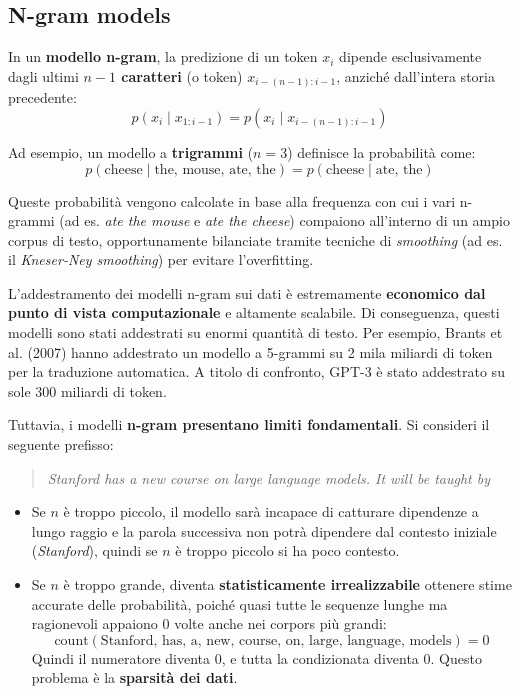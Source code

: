 \subsection{N-gram models}

In un \textbf{modello n-gram}, la predizione di un token $x_i$ dipende esclusivamente dagli ultimi \textbf{$n - 1$ caratteri} (o token) $x_{i-(n-1):i-1}$, anziché dall'intera storia precedente:
\[
p(x_i \mid x_{1:i-1}) = p(x_i \mid x_{i-(n-1):i-1})
\]

Ad esempio, un modello a \textbf{trigrammi} ($n = 3$) definisce la probabilità come:
\[
p(\text{cheese} \mid \text{the, mouse, ate, the}) = p(\text{cheese} \mid \text{ate, the})
\]

Queste probabilità vengono calcolate in base alla frequenza con cui i vari n-grammi (ad es. \textit{ate the mouse} e \textit{ate the cheese}) compaiono all'interno di un ampio corpus di testo, opportunamente bilanciate tramite tecniche di \textit{smoothing} (ad es. il \textit{Kneser-Ney smoothing}) per evitare l'overfitting.

L'addestramento dei modelli n-gram sui dati è estremamente \textbf{economico dal punto di vista computazionale} e altamente scalabile. Di conseguenza, questi modelli sono stati addestrati su enormi quantità di testo. Per esempio, Brants et al. (2007) hanno addestrato un modello a 5-grammi su 2 mila miliardi di token per la traduzione automatica.
A titolo di confronto, GPT-3 è stato addestrato su sole 300 miliardi di token.

Tuttavia, i modelli \textbf{n-gram presentano limiti fondamentali}. Si consideri il seguente prefisso:
\begin{quote}
\textit{Stanford has a new course on large language models. It will be taught by \underline{\hspace{1cm}}}
\end{quote}

\begin{itemize}
    \item Se $n$ è troppo piccolo, il modello sarà incapace di catturare dipendenze a lungo raggio e la parola successiva non potrà dipendere dal contesto iniziale (\textit{Stanford}),
    quindi se $n$ è troppo piccolo si ha poco contesto.
    \item Se $n$ è troppo grande, diventa \textbf{statisticamente irrealizzabile} ottenere stime accurate delle probabilità, poiché quasi tutte le sequenze lunghe ma ragionevoli appaiono $0$ volte anche nei corpors più grandi:
    \[
    \text{count}(\text{Stanford, has, a, new, course, on, large, language, models}) = 0
    \]
    Quindi il numeratore diventa 0, e tutta la condizionata diventa 0.
    Questo problema è la \textbf{sparsità dei dati}.
\end{itemize}

